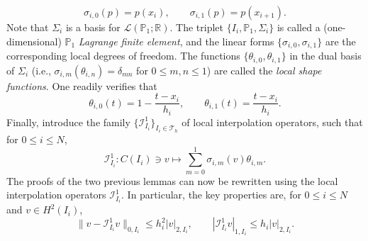\begin{equation}
    \sigma_{i,0}(p) = p(x_i),\qquad \sigma_{i,1}(p) = p(x_{i+1}).
\end{equation}
Note that $\Sigma_i$ is a basis for $\mathcal{L}(\mathbb{P}_1; \mathbb{R})$. The triplet $\{I_i, \mathbb{P}_1, \Sigma_i\}$ is called a (one-dimensional) $\mathbb{P}_1$ \emph{Lagrange finite element}, and the linear forms $\{\sigma_{i,0}, \sigma_{i,1}\}$ are the corresponding local degrees of freedom. The functions $\{\theta_{i,0}, \theta_{i,1}\}$ in the dual basis of $\Sigma_i$ (i.e., $\sigma_{i,m}(\theta_{i,n}) = \delta_{mn}$ for $0 \le m, n \le 1$) are called the \emph{local shape functions}. One readily verifies that
\begin{equation}
    \theta_{i,0}(t) = 1 - \frac{t - x_i}{h_i},\qquad \theta_{i,1}(t) = \frac{t - x_i}{h_i}.
\end{equation}
Finally, introduce the family $\{\mathcal{I}_{I_i}^1\}_{I_i \in \mathcal{T}_h}$ of local interpolation operators, such that for $0\leq i\leq N$,
\begin{equation}
    \mathcal{I}_{I_i}^1: C(I_i) \ni v \mapsto \sum_{m=0}^1 \sigma_{i,m}(v) \theta_{i,m}.
\end{equation}
The proofs of the two previous lemmas can now be rewritten using the local interpolation operators $\mathcal{I}_{I_i}^1$. In particular, the key properties are, for $0 \le i \le N$ and $v \in H^2(I_i)$,
\begin{equation}
    \|v - \mathcal{I}_{I_i}^1 v\|_{0,I_i} \le h_i^2 |v|_{2,I_i},\qquad|\mathcal{I}_{I_i}^1 v|_{1,I_i} \le h_i |v|_{2,I_i}.
\end{equation}
